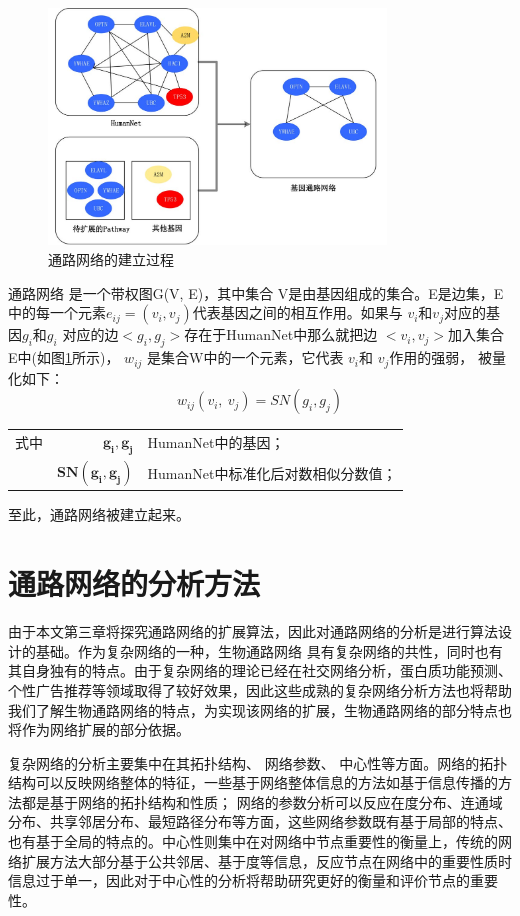 \begin{figure}
\centering
\includegraphics[width = 0.8\textwidth]{pathway_cons}
\caption[fig21]{通路网络的建立过程}
\label{fig21}
\end{figure}
通路网络 是一个带权图G(V, E)，其中集合 V是由基因组成的集合。E是边集，E中的每一个元素$e_{ij}=(v_{i}, v_{j})$代表基因之间的相互作用。如果与 $v_{i}$和$v_{j}$对应的基因$g_{i}$和$g_{i}$ 对应的边$< g_{i} ,g_{j}  >$存在于HumanNet中那么就把边 $< v_{i} ,v_{j}  >$加入集合E中(如图\ref{fig21}所示)， $w_{ij}$ 是集合W中的一个元素，它代表 $v_{i}$和 $v_{j}$作用的强弱， 被量化如下：
\begin{equation}\label{eq22}
w_{ij} ( v_{i} ,\ v_{j}) =SN( g_{i} ,g_{j})
\end{equation}
\begin{tabularx}{\textwidth}{@{}l@{\quad}r@{———}X@{}}
式中 & $\boldsymbol{ g_{i}, g_{j}}$ &HumanNet中的基因；\\
	& $\boldsymbol{SN( g_{i} ,g_{j})}$ & HumanNet中标准化后对数相似分数值；\\
\end{tabularx}\vspace{3.15bp}
至此，通路网络被建立起来。


\section{ 通路网络的分析方法}
由于本文第三章将探究通路网络的扩展算法，因此对通路网络的分析是进行算法设计的基础。作为复杂网络的一种，生物通路网络
具有复杂网络的共性，同时也有其自身独有的特点。由于复杂网络的理论已经在社交网络分析，蛋白质功能预测、个性广告推荐等领域取得了较好效果，因此这些成熟的复杂网络分析方法也将帮助我们了解生物通路网络的特点，为实现该网络的扩展，生物通路网络的部分特点也将作为网络扩展的部分依据。

复杂网络的分析主要集中在其拓扑结构、 网络参数、 中心性等方面。网络的拓扑结构可以反映网络整体的特征，一些基于网络整体信息的方法如基于信息传播的方法\cite{emig2013drug}都是基于网络的拓扑结构和性质； 网络的参数分析可以反应在度分布、连通域分布、共享邻居分布、最短路径分布等方面，这些网络参数既有基于局部的特点、也有基于全局的特点的。中心性则集中在对网络中节点重要性的衡量上，传统的网络扩展方法大部分基于公共邻居、基于度\cite{lu2011link}等信息，反应节点在网络中的重要性质时信息过于单一，因此对于中心性的分析将帮助研究更好的衡量和评价节点的重要性。

